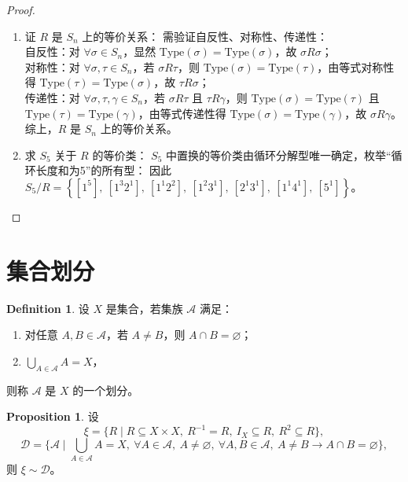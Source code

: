 \documentclass[oneside]{book}
\theoremstyle{definition}
\newtheorem{proposition}{Proposition}[section]
\newtheorem{definition}{Definition}[section]
\begin{document}
\begin{proof}
	\begin{enumerate}
		\item 证 \( R \) 是 \( S_n \) 上的等价关系：  
		需验证自反性、对称性、传递性：  \\
		自反性：对 \( \forall \sigma \in S_n \)，显然 \( \text{Type}(\sigma) = \text{Type}(\sigma) \)，故 \( \sigma R \sigma \)；  \\
		对称性：对 \( \forall \sigma, \tau \in S_n \)，若 \( \sigma R \tau \)，则 \( \text{Type}(\sigma) = \text{Type}(\tau) \)，由等式对称性得 \( \text{Type}(\tau) = \text{Type}(\sigma) \)，故 \( \tau R \sigma \)；  \\
		传递性：对 \( \forall \sigma, \tau, \gamma \in S_n \)，若 \( \sigma R \tau \) 且 \( \tau R \gamma \)，则 \( \text{Type}(\sigma) = \text{Type}(\tau) \) 且 \( \text{Type}(\tau) = \text{Type}(\gamma) \)，由等式传递性得 \( \text{Type}(\sigma) = \text{Type}(\gamma) \)，故 \( \sigma R \gamma \)。  
		综上，\( R \) 是 \( S_n \) 上的等价关系。
		
		\item 求 \( S_5 \) 关于 \( R \) 的等价类：  
		\( S_5 \) 中置换的等价类由循环分解型唯一确定，枚举“循环长度和为5”的所有型：  
		因此 \( S_5/R = \left\{ [1^5],\ [1^3 2^1],\ [1^1 2^2],\ [1^2 3^1],\ [2^1 3^1],\ [1^1 4^1],\ [5^1] \right\} \)。
	\end{enumerate}
\end{proof}

\section{集合划分}

\begin{definition}设 \( X \) 是集合，若集族 \( \mathscr{A} \) 满足：
\begin{enumerate}
	\item 对任意 \( A, B \in \mathscr{A} \)，若 \( A \neq B \)，则 \( A \cap B = \varnothing \)；
	\item \( \bigcup_{A \in \mathscr{A}} A = X \)，
\end{enumerate}
则称 \( \mathscr{A} \) 是 \( X \) 的一个划分。
\end{definition}


\begin{proposition}
	设
	\[
	\xi = \{ R \mid R \subseteq X \times X,\ R^{-1}=R,\ I_X \subseteq R,\ R^2 \subseteq R \},
	\]
	\[
	\mathscr{D} = \{ \mathscr{A} \mid \bigcup_{A \in \mathscr{A}} A = X,\ \forall A \in \mathscr{A},\ A \neq \varnothing,\ \forall A,B \in \mathscr{A},\ A \neq B \to A \cap B = \varnothing \} ,
	\]
	则 \( \xi \sim \mathscr{D} \)。
\end{proposition}
\end{document}
